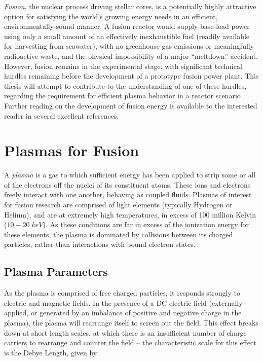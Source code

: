 \emph{Fusion}, the nuclear process driving stellar cores, is a potentially highly attractive option for satisfying the world's growing energy needs in an efficient, environmentally-sound manner.  A fusion reactor would supply base-load power using only a small amount of an effectively inexhaustible fuel (readily available for harvesting from seawater), with no greenhouse gas emissions or meaningfully radioactive waste, and the physical impossibility of a major ``meltdown'' accident.  However, fusion remains in the experimental stage, with significant technical hurdles remaining before the development of a prototype fusion power plant.  This thesis will attempt to contribute to the understanding of one of these hurdles, regarding the requirement for efficient plasma behavior in a reactor scenario   Further reading on the development of fusion energy is available to the interested reader in several excellent references. \cite{Freidberg2007,Wesson2011,Chen1984} \nicesectionending


\section{Plasmas for Fusion}\label{sec:intro_plasmas}

A \emph{plasma} is a gas to which sufficient energy has been applied to strip some or all of the electrons off the nuclei of its constituent atoms.  These ions and electrons freely interact with one another, behaving as coupled fluids.  Plasmas of interest for fusion research are comprised of light elements (typically Hydrogen or Helium), and are at extremely high temperatures, in excess of 100 million Kelvin ($10-20 \;\si{keV}$).  As these conditions are far in excess of the ionization energy for these elements, the plasma is dominated by collisions between its charged particles, rather than interactions with bound electron states.

\subsection{Plasma Parameters}\label{subsec:intro_params}

As the plasma is comprised of free charged particles, it responds strongly to electric and magnetic fields.  In the presence of a DC electric field (externally applied, or generated by an imbalance of positive and negative charge in the plasma), the plasma will rearrange itself to screen out the field.  This effect breaks down at short length scales, at which there is an insufficient number of charge carriers to rearrange and counter the field -- the characteristic scale for this effect is the Debye Length, given by

